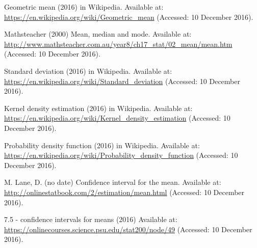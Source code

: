 \documentclass[12pt]{article} %
\begin{document}
\begin{thebibliography}{99}
 Geometric mean (2016) in Wikipedia. Available at: \url{https://en.wikipedia.org/wiki/Geometric_mean} (Accessed: 10 December 2016).

Mathsteacher (2000) Mean, median and mode. Available at: \url{http://www.mathsteacher.com.au/year8/ch17_stat/02_mean/mean.htm} (Accessed: 10 December 2016).

Standard deviation (2016) in Wikipedia. Available at: \url{https://en.wikipedia.org/wiki/Standard_deviation} (Accessed: 10 December 2016).

Kernel density estimation (2016) in Wikipedia. Available at: \url{https://en.wikipedia.org/wiki/Kernel_density_estimation} (Accessed: 10 December 2016).

Probability density function (2016) in Wikipedia. Available at: \url{https://en.wikipedia.org/wiki/Probability_density_function} (Accessed: 10 December 2016).

 M. Lane, D. (no date) Confidence interval for the mean. Available at: \url{http://onlinestatbook.com/2/estimation/mean.html} (Accessed: 10 December 2016).

7.5 - confidence intervals for means (2016) Available at: \url{https://onlinecourses.science.psu.edu/stat200/node/49} (Accessed: 10 December 2016).

\end{thebibliography}
\end{document}
